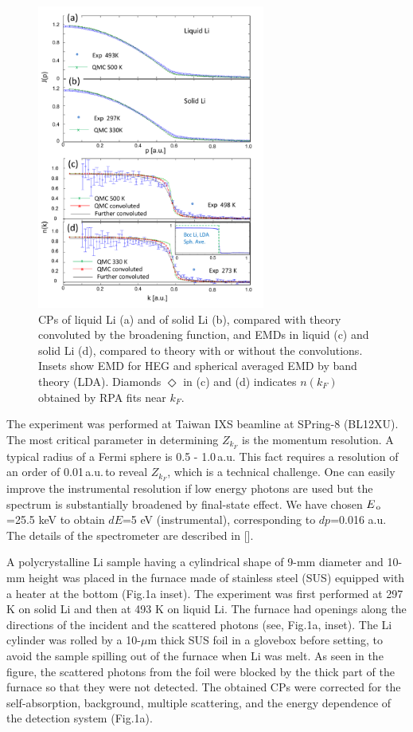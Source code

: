 \documentclass[twocolumn,showpacs,showkeys,fleqn,prl,superscriptaddress]{revtex4}%
\newcommand{\nn}[1]{\textnormal{ #1}}
\begin{document}
\begin{figure}
\includegraphics[bb= 50 10 500 720, width=7.5cm]{fig2.pdf}
\caption{CPs of liquid Li (a) and of solid Li (b), compared with theory convoluted by the broadening function, and EMDs in liquid (c) and solid Li (d), compared to theory with or without the convolutions. Insets show EMD for HEG and spherical averaged EMD by band theory (LDA). Diamonds $\Diamond$ in (c) and (d)  indicates $n(k_F)$ obtained by RPA fits near $k_F$.}
\label{Fig.2}
\end{figure}

The experiment was performed at Taiwan IXS beamline at SPring-8 (BL12XU).
The most critical parameter in determining $Z_{k_F}$ is the momentum resolution. 
A typical radius of a Fermi sphere is 0.5 - 1.0\,a.u. This fact requires a resolution of an order of 0.01\,a.u.\,to reveal $Z_{k_F}$, which is a technical challenge.
One can easily improve the instrumental resolution if low energy photons are used but the spectrum is substantially broadened by final-state effect\cite{stern00,soi01}.
We have chosen $E_{\nn{\!o}}$=25.5 keV to obtain $dE$=5 eV (instrumental), corresponding to $dp$=0.016 a.u.
The details of the spectrometer are described in []. 


A polycrystalline Li sample having a cylindrical shape of 9-mm diameter and 10-mm height was placed in the furnace made of stainless steel (SUS) equipped with a heater at the bottom (Fig.1a inset).
The experiment was first performed at 297 K on solid Li and then at 493 K on liquid Li. 
The furnace had openings along the directions of the incident and the scattered photons (see, Fig.1a, inset).
The Li cylinder was rolled by a 10-$\mu$m thick SUS foil in a glovebox before setting, to avoid the sample spilling out of the furnace when Li was melt.
As seen in the figure, the scattered photons from the foil were blocked by the thick part of the furnace so that they were not detected.
The obtained CPs were corrected for the self-absorption, background, multiple scattering, and the energy dependence of the detection system (Fig.1a).
\end{document}
